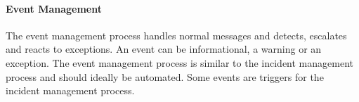 \paragraph{Event Management}
The event management process handles normal messages and detects, escalates and reacts to exceptions. An event can be informational, a warning or an exception. The event management process is similar to the incident management process and should ideally be automated. Some events are triggers for the incident management process.
